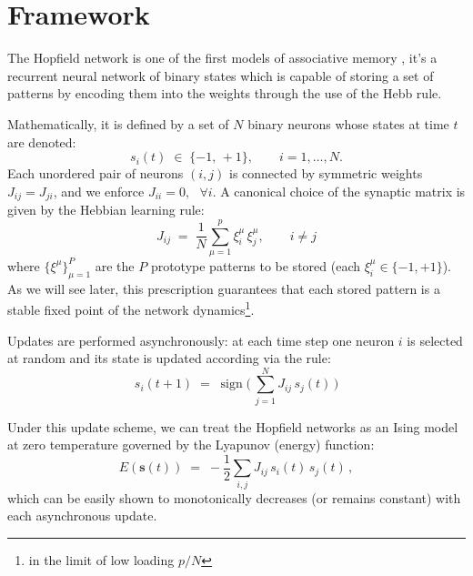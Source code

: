 \documentclass[a4paper,12pt]{report}
\begin{document}
\section{Framework}
The Hopfield network is one of the first models of associative memory 
\cite{Hopfield1982, Hopfield1984}, it's a recurrent neural network of binary states 
which is capable of storing a set of patterns by encoding them into the weights 
through the use of the Hebb rule.

Mathematically, it is defined by a set of \(N\) binary neurons whose states at time 
\(t\) are denoted:
\[
s_i(t) \;\in\; \{ -1,\,+1\}, 
\qquad i = 1, \dots, N.
\]
Each unordered pair of neurons \((i,j)\) is connected by symmetric weights 
\(J_{ij} = J_{ji}\), and we enforce \(J_{ii}=0, \hspace{8pt} \forall i\). A canonical 
choice of the synaptic matrix is given by the Hebbian learning rule:
\begin{equation}
J_{ij}
\;=\;
\frac{1}{N} \sum_{\mu=1}^{p} \xi_i^{\mu}\,\xi_j^{\mu}, \qquad i \neq j
\end{equation}
where \(\{\xi^{\mu}\}_{\mu=1}^P\) are the \(P\) prototype patterns to be stored 
(each \(\xi_i^\mu\in\{-1,+1\}\)). As we will see later, this prescription guarantees 
that each stored pattern is a stable fixed point of the network 
dynamics\footnote{in the limit of low loading \(p/N\)}.

Updates are performed asynchronously: at each time step one neuron \(i\) is selected 
at random and its state is updated according via the rule:
\begin{equation}
  s_i(t+1)\;=\;\operatorname{sign}\bigl(\,\sum_{j=1}^N J_{ij}\,s_j(t)\,\bigr)
\end{equation}

Under this update scheme, we can treat the Hopfield networks as an Ising model at zero
temperature governed by the Lyapunov (energy) function:
\begin{equation}\label{eq:energy}
E(\mathbf{s}\left(t\right))
\;=\;
- \frac{1}{2} \sum_{i,j} J_{ij}\,s_i\left(t\right)\,s_j\left(t\right)\,,
\end{equation}
which can be easily shown to monotonically decreases (or remains constant) with each 
asynchronous update.
\end{document}
